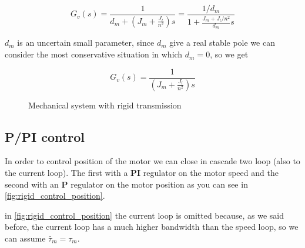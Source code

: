 \[
    G_v(s) = \frac{1}{d_m + \left(J_m + \frac{J_l}{n^2}\right) s} = \frac{1/d_m}{1 + \frac{J_m + J_l/n^2}{d_m} s}
\]

$d_m$ is an uncertain small parameter, since $d_m$ give a real stable pole we can consider the most conservative situation in which $d_m=0$, so we get

\[
    G_v(s) = \frac{1}{\left(J_m + \frac{J_l}{n^2}\right) s}
\]

\begin{figure}[htb]
\centering
{}%
\caption{Mechanical system with rigid transmission}
\label{fig:mechanical_system_rigid}
\end{figure}

\subsection{P/PI control}

In order to control position of the motor we can close in cascade two loop (also to the current loop).
The first with a \textbf{PI} regulator on the motor speed and the second with an \textbf{P} regulator on the motor position as you can see in \autoref{fig:rigid_control_position}.

\begin{nb}in \autoref{fig:rigid_control_position} the current loop is omitted because, as we said before, the current loop has a much higher bandwidth than the speed loop, so we can assume $\bar{\tau}_m=\tau_m$.\end{nb}

